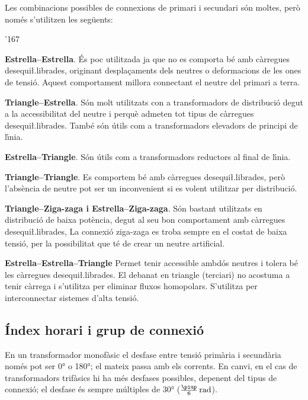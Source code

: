 Les combinacions possibles de connexions de primari i secundari s\'{o}n moltes, per\`{o} nom\'{e}s s'utilitzen les seg\"{u}ents:
\begin{dinglist}{'167}
   \item \textbf{Estrella--Estrella}. \'{E}s poc utilitzada ja que no es comporta b\'{e} amb c\`{a}rregues desequi{\l.l}ibrades, originant despla\c{c}aments dels neutres o deformacions de les ones de tensi\'{o}. Aquest comportament millora connectant el neutre del primari a terra.
   \item \textbf{Triangle--Estrella}. S\'{o}n molt utilitzats con a transformadors de distribuci\'{o} degut a la accessibilitat del neutre i perqu\`{e} admeten tot tipus de c\`{a}rregues desequi{\l.l}ibrades. Tamb\'{e} s\'{o}n \'{u}tils com a transformadors elevadors de principi de l\'{\i}nia.
   \item \textbf{Estrella--Triangle}. S\'{o}n \'{u}tils com a transformadors reductors al final de l\'{\i}nia.
   \item \textbf{Triangle--Triangle}. Es comportem b\'{e} amb c\`{a}rregues desequi{\l.l}ibrades, per\`{o} l'abs\`{e}ncia de neutre pot ser un inconvenient si es volent utilitzar per distribuci\'{o}.
   \item \textbf{Triangle--Ziga-zaga i Estrella--Ziga-zaga}. S\'{o}n bastant utilitzats en distribuci\'{o} de baixa pot\`{e}ncia, degut al seu bon comportament amb c\`{a}rregues desequi{\l.l}ibrades, La connexi\'{o} ziga-zaga es troba sempre en el costat de baixa tensi\'{o}, per la possibilitat que t\'{e} de crear un neutre artificial.
   \item \textbf{Estrella--Estrella--Triangle} Permet tenir accessible ambd\'{o}s  neutres i tolera  b\'{e} les c\`{a}rregues  desequi{\l.l}ibrades. El debanat en triangle (terciari) no acostuma a tenir c\`{a}rrega i s'utilitza per eliminar fluxos homopolars. S'utilitza per interconnectar sistemes d'alta tensi\'{o}.
\end{dinglist}


\subsection{\'{I}ndex horari i grup de connexi\'{o}}\label{sec:connex-index-horari}

En un transformador monof\`{a}sic el desfase entre tensi\'{o} prim\`{a}ria i secund\`{a}ria nom\'{e}s pot ser \ang{0} o \ang{180}; el mateix passa amb els corrents. En canvi, en el cas de transformadors trif\`{a}sics hi ha m\'{e}s desfases possibles, depenent del tipus de connexi\'{o}; el desfase \'{e}s sempre m\'{u}ltiples de \ang{30} ($\frac{\piup}{6}\unit{rad}$).


